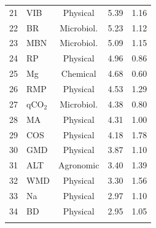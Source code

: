 \documentclass[12pt]{article}
\begin{document}
\begin{table}[ht]
\begin{tabular}{rlccc}
21 & VIB   & Physical     & 5.39 & 1.16 \\
22 & BR    & Microbiol.   & 5.23 & 1.12 \\
23 & MBN   & Microbiol.   & 5.09 & 1.15 \\
24 & RP    & Physical     & 4.96 & 0.86 \\
25 & Mg    & Chemical     & 4.68 & 0.60 \\
26 & RMP   & Physical     & 4.53 & 1.29 \\
27 & qCO$_2$  & Microbiol. & 4.38 & 0.80 \\
28 & MA    & Physical     & 4.31 & 1.00 \\
29 & COS   & Physical     & 4.18 & 1.78 \\
30 & GMD   & Physical     & 3.87 & 1.10 \\
31 & ALT   & Agronomic    & 3.40 & 1.39 \\
32 & WMD   & Physical     & 3.30 & 1.56 \\
33 & Na    & Physical     & 2.97 & 1.10 \\
34 & BD    & Physical     & 2.95 & 1.05 \\
\botrule
\end{tabular}
\smallskip

\end{table}
\end{document}

